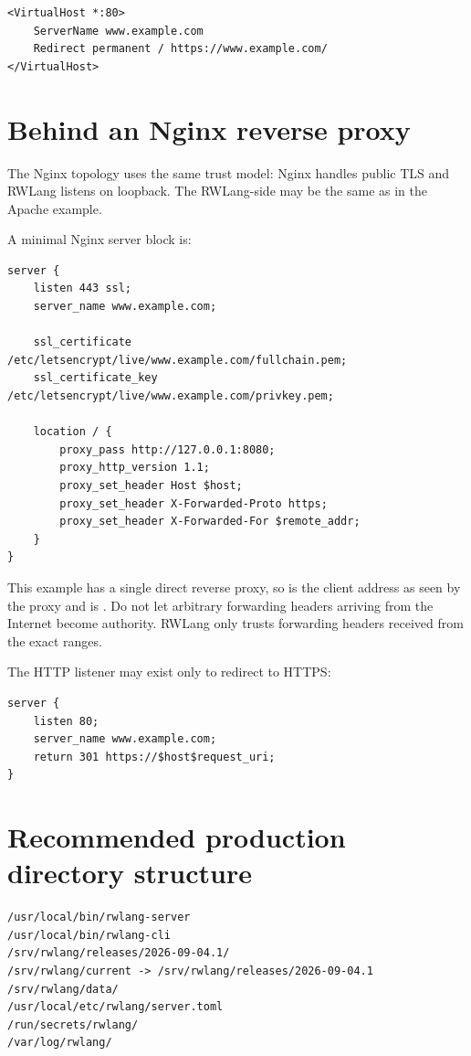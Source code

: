 \begin{lstlisting}
<VirtualHost *:80>
    ServerName www.example.com
    Redirect permanent / https://www.example.com/
</VirtualHost>
\end{lstlisting}

\section{Behind an Nginx reverse proxy}

The Nginx topology uses the same trust model: Nginx handles public TLS and RWLang listens on loopback. The RWLang-side  may be the same as in the Apache example.

A minimal Nginx server block is:

\begin{lstlisting}
server {
    listen 443 ssl;
    server_name www.example.com;

    ssl_certificate     /etc/letsencrypt/live/www.example.com/fullchain.pem;
    ssl_certificate_key /etc/letsencrypt/live/www.example.com/privkey.pem;

    location / {
        proxy_pass http://127.0.0.1:8080;
        proxy_http_version 1.1;
        proxy_set_header Host $host;
        proxy_set_header X-Forwarded-Proto https;
        proxy_set_header X-Forwarded-For $remote_addr;
    }
}
\end{lstlisting}

This example has a single direct reverse proxy, so  is the client address as seen by the proxy and  is . Do not let arbitrary forwarding headers arriving from the Internet become authority. RWLang only trusts forwarding headers received from the exact  ranges.

The HTTP listener may exist only to redirect to HTTPS:

\begin{lstlisting}
server {
    listen 80;
    server_name www.example.com;
    return 301 https://$host$request_uri;
}
\end{lstlisting}

\section{Recommended production directory structure}

\begin{lstlisting}
/usr/local/bin/rwlang-server
/usr/local/bin/rwlang-cli
/srv/rwlang/releases/2026-09-04.1/
/srv/rwlang/current -> /srv/rwlang/releases/2026-09-04.1
/srv/rwlang/data/
/usr/local/etc/rwlang/server.toml
/run/secrets/rwlang/
/var/log/rwlang/
\end{lstlisting}

